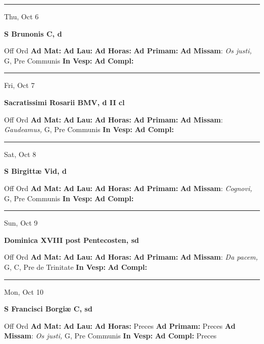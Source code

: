 \documentclass[letterpaper, 10pt]{article}
\begin{document}
\hrule
\begin{center}
Thu, Oct 6
\end{center}\textbf{ \large S Brunonis C, \textnormal{\normalsize d}}
\begin{justify}
Off Ord
\textbf{Ad Mat: }
\textbf{Ad Lau: }
\textbf{Ad Horas: }
\textbf{Ad Primam: }
\textbf{Ad Missam}: \textit{Os justi,} G, Pre Communis
\textbf{In Vesp: }
\textbf{Ad Compl: }\end{justify}



\hrule
\begin{center}
Fri, Oct 7
\end{center}\textbf{ \large Sacratissimi Rosarii BMV, \textnormal{\normalsize d II cl}}
\begin{justify}
Off Ord
\textbf{Ad Mat: }
\textbf{Ad Lau: }
\textbf{Ad Horas: }
\textbf{Ad Primam: }
\textbf{Ad Missam}: \textit{Gaudeamus,} G, Pre Communis
\textbf{In Vesp: }
\textbf{Ad Compl: }\end{justify}



\hrule
\begin{center}
Sat, Oct 8
\end{center}\textbf{ \large S Birgittæ Vid, \textnormal{\normalsize d}}
\begin{justify}
Off Ord
\textbf{Ad Mat: }
\textbf{Ad Lau: }
\textbf{Ad Horas: }
\textbf{Ad Primam: }
\textbf{Ad Missam}: \textit{Cognovi,} G, Pre Communis
\textbf{In Vesp: }
\textbf{Ad Compl: }\end{justify}



\hrule
\begin{center}
Sun, Oct 9
\end{center}\textbf{ \large Dominica XVIII post Pentecosten, \textnormal{\normalsize sd}}
\begin{justify}
Off Ord
\textbf{Ad Mat: }
\textbf{Ad Lau: }
\textbf{Ad Horas: }
\textbf{Ad Primam: }
\textbf{Ad Missam}: \textit{Da pacem,} G, C, Pre de Trinitate
\textbf{In Vesp: }
\textbf{Ad Compl: }\end{justify}



\hrule
\begin{center}
Mon, Oct 10
\end{center}\textbf{ \large S Francisci Borgiæ C, \textnormal{\normalsize sd}}
\begin{justify}
Off Ord
\textbf{Ad Mat: }
\textbf{Ad Lau: }
\textbf{Ad Horas: }Preces
\textbf{Ad Primam: }Preces
\textbf{Ad Missam}: \textit{Os justi,} G, Pre Communis
\textbf{In Vesp: }
\textbf{Ad Compl: }Preces\end{justify}
\end{document}
